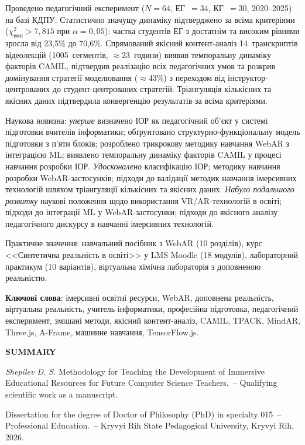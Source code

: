 Проведено педагогічний експеримент ($N = 64$, ЕГ~$= 34$, КГ~$= 30$, 2020--2025) на базі КДПУ. Статистично значущу динаміку підтверджено за всіма критеріями ($\chi^2_{\text{емп}} > 7{,}815$ при $\alpha = 0{,}05$): частка студентів ЕГ з достатнім та високим рівнями зросла від 23,5\% до 70,6\%. Спрямований якісний контент-аналіз 14~транскриптів відеолекцій (1005~сегментів, $\approx$23~години) виявив темпоральну динаміку факторів CAMIL, підтвердив реалізацію всіх педагогічних умов та розкрив домінування стратегії моделювання ($\approx$43\%) з переходом від інструктор-центрованих до студент-центрованих стратегій. Тріангуляція кількісних та якісних даних підтвердила конвергенцію результатів за всіма критеріями.

Наукова новизна: \textit{уперше} визначено ІОР як педагогічний об'єкт у системі підготовки вчителів інформатики; обґрунтовано структурно-функціональну модель підготовки з п'яти блоків; розроблено трикрокову методику навчання WebAR з інтеграцією ML; виявлено темпоральну динаміку факторів CAMIL у процесі навчання розробки ІОР. \textit{Удосконалено} класифікацію ІОР; методику навчання розробки WebAR-застосунків; підходи до валідації методик навчання імерсивних технологій шляхом тріангуляції кількісних та якісних даних. \textit{Набуло подальшого розвитку} наукові положення щодо використання VR/AR-технологій в освіті; підходи до інтеграції ML у WebAR-застосунки; підходи до якісного аналізу педагогічного дискурсу в навчанні імерсивних технологій.

Практичне значення: навчальний посібник з WebAR (10 розділів), курс <<Синтетична реальність в освіті>> у LMS Moodle (18 модулів), лабораторний практикум (10 варіантів), віртуальна хімічна лабораторія з доповненою реальністю.

\textbf{Ключові слова}: імерсивні освітні ресурси, WebAR, доповнена реальність, віртуальна реальність, учитель інформатики, професійна підготовка, педагогічний експеримент, змішані методи, якісний контент-аналіз, CAMIL, TPACK, MindAR, Three.js, A-Frame, машинне навчання, TensorFlow.js.

\clearpage

\begin{center}
{\large \textbf{SUMMARY}}
\end{center}

\textit{Shepilev D. S.} Methodology for Teaching the Development of Immersive Educational Resources for Future Computer Science Teachers.~-- Qualifying scientific work as a manuscript.

Dissertation for the degree of Doctor of Philosophy (PhD) in specialty 015~-- Professional Education.~-- Kryvyi Rih State Pedagogical University, Kryvyi Rih, 2026.\\

